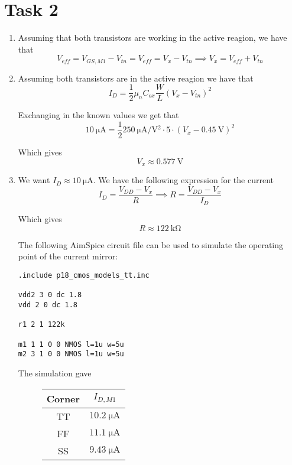 \documentclass[a4paper,11pt,norsk]{article}
\begin{document}
\section*{Task 2}
\begin{enumerate}
\item 
Assuming that both transistors are working in the active reagion, we have that 
\[
    V_{eff} = V_{GS,M1} - V_{tn} = V_{eff} = V_x - V_{tn} \implies V_{x} = V_{eff} + V_{tn}
\]    

\item 
Assuming both transistors are in the active reagion we have that
\[
    I_D = \frac{1}{2} \mu_n C_{ox} \frac{W}{L} (V_x - V_{tn})^2
\]

Exchanging in the known values we get that
\[
    \SI{10}{\micro\ampere} = \frac{1}{2} \SI{250}{\micro\ampere\per\volt^2} \cdot 5 \cdot (V_x - \SI{0.45}{\volt})^2
\]

Which gives 
\[
    V_x \approx \SI{0.577}{\volt}
\]

\item 
We want $I_D \approx \SI{10}{\micro\ampere}$. We have the following expression for the current 
\[
    I_D = \frac{V_{DD} - V_x}{R} \implies R = \frac{V_{DD} - V_x}{I_D}
\]

Which gives
\[
    R \approx \SI{122}{\kilo\ohm}
\]

The following AimSpice circuit file can be used to simulate the operating point of the
current mirror:
\begin{tcolorbox}[colback=white!95!blue, title= AimSpice circuit file, colframe=gray!85!black]
\begin{verbatim}
.include p18_cmos_models_tt.inc

vdd2 3 0 dc 1.8
vdd 2 0 dc 1.8

r1 2 1 122k

m1 1 1 0 0 NMOS l=1u w=5u
m2 3 1 0 0 NMOS l=1u w=5u
\end{verbatim}
\end{tcolorbox}
The simulation gave 
\begin{figure}[H]
    \centering
    \begin{tabular}{|c|c|}
        \hline
        \textbf{Corner} & \textbf{$I_{D,M1}$} \\
        \hline
        TT & $\SI{10.2}{\micro\ampere}$ \\
        FF & $\SI{11.1}{\micro\ampere}$ \\
        SS & $\SI{9.43}{\micro\ampere}$ \\
        \hline
    \end{tabular}
\end{figure}


\end{enumerate}
\end{document}
